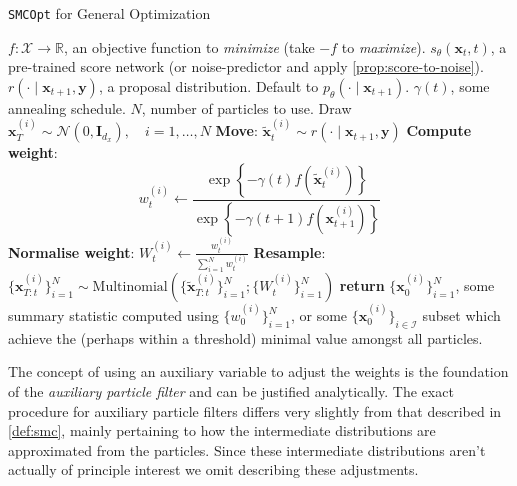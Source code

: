 \begin{algorithm}[ht]
    \caption{\texttt{SMCOpt} for General Optimization} \label{alg:smc-opt}
    \begin{algorithmic}
        \Require $f: \mathcal{X} \to \mathbb{R}$, an objective function to \emph{minimize} (take $-f$ to \emph{maximize}).
        \Require $s_\theta(\mathbf{x}_t, t)$, a pre-trained score network (or noise-predictor and apply \ref{prop:score-to-noise}).
        \Require $r(\cdot \mid \mathbf{x}_{t+1}, \mathbf{y})$, a proposal distribution. Default to $p_\theta(\cdot \mid \mathbf{x}_{t+1})$.
        \Require $\gamma(t)$, some annealing schedule.
        \Require $N$, number of particles to use.
        \State Draw $\mathbf{x}_T^{(i)} \sim \mathcal{N}(0, \mathbf{I}_{d_x}),\quad i=1,\ldots,N$
                \State \textbf{Move}: $\tilde{\mathbf{x}}_{t}^{(i)} \sim r(\cdot \mid \mathbf{x}_{t+1}, \mathbf{y})$
                \State \textbf{Compute weight}:
                \begin{equation}
                    w_t^{(i)} \gets \frac{\exp\left\{-\gamma(t) f(\tilde{\mathbf{x}}_t^{(i)})\right\}}{\exp\left\{-\gamma(t+1) f(\mathbf{x}_{t+1}^{(i)})\right\}} \label{eq:weight-formula}
                \end{equation}
                \State \textbf{Normalise weight}: $W_t^{(i)} \gets \frac{w_t^{(i)}}{\sum_{i=1}^N w_t^{(i)}}$
                \State \textbf{Resample}: $\{\mathbf{x}_{T:t}^{(i)}\}_{i=1}^N \sim \text{Multinomial}\left(\{\tilde{\mathbf{x}}_{T:t}^{(i)}\}_{i=1}^N; \{W_t^{(i)}\}_{i=1}^N\right)$
            \EndFor
        \EndFor
        \State \textbf{return} $\{\mathbf{x}_0^{(i)}\}_{i=1}^N$, some summary statistic computed
        using $\{w_0^{(i)}\}_{i=1}^N$, or some $\{\mathbf{x}_0^{(i)}\}_{i \in \mathcal{I}}$
        subset which achieve the (perhaps within a threshold) minimal value amongst all particles.
    \end{algorithmic}
\end{algorithm}

\begin{remark}
    The concept of using an auxiliary variable to adjust the weights is the foundation of the
    \emph{auxiliary particle filter} \parencite{chopinIntroductionSequentialMonte2020} and can be
    justified analytically. The exact procedure for auxiliary particle filters differs very slightly
    from that described in \ref{def:smc}, mainly pertaining to how the intermediate distributions
    are approximated from the particles. Since these intermediate distributions aren't actually of
    principle interest we omit describing these adjustments.
\end{remark}

